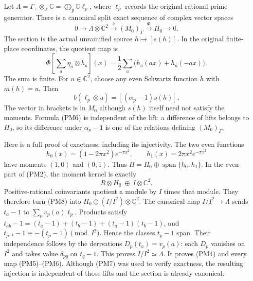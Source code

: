 \documentclass[11pt,a4paper]{article}
\theoremstyle{definition}\newtheorem{definition}[theorem]{Definition}
\begin{document}
Let $\Lambda=\Gamma_+\otimes_{\mathbb Z}\mathbb C
=\bigoplus_p\mathbb C\ell_p$, where $\ell_p$ records the
original rational prime generator. There is a canonical split
exact sequence of complex vector spaces
\[
 0\longrightarrow\Lambda\otimes\mathbb C^2
   \xrightarrow{\ b\ }(M_0)_\Gamma
   \xrightarrow{\ \Phi\ }H_0\longrightarrow0.
 \tag{PM4}
\]
The section is the actual unramified source $h\mapsto[s(h)]$.
In the original finite-place coordinates, the quotient map is
\[
 \Phi\left[\sum_a\eta_a\otimes h_a\right](x)
       =\frac12\sum_a\bigl(h_a(ax)+h_a(-ax)\bigr).
 \tag{PM5}
\]
The sum is finite. For $u\in\mathbb C^2$, choose any even
Schwartz function $h$ with $m(h)=u$. Then
\[
 b(\ell_p\otimes u)=[(\alpha_p-1)s(h)].
 \tag{PM6}
\]
The vector in brackets is in $M_0$ although $s(h)$ itself need
not satisfy the moments. Formula (PM6) is independent of the
lift: a difference of lifts belongs to $H_0$, so its difference
under $\alpha_p-1$ is one of the relations defining $(M_0)_\Gamma$.

Here is a full proof of exactness, including its injectivity.
The two even functions
\[
 h_0(x)=(1-2\pi x^2)e^{-\pi x^2},\qquad
 h_1(x)=2\pi x^2e^{-\pi x^2}
 \tag{PM7}
\]
have moments $(1,0)$ and $(0,1)$. Thus $H=H_0\oplus
\operatorname{span}\{h_0,h_1\}$. In the even part of (PM2),
the moment kernel is exactly
\[
 R\otimes H_0\ \oplus\ I\otimes\mathbb C^2.
 \tag{PM8}
\]
Positive-rational coinvariants quotient a module by $I$ times
that module. They therefore turn (PM8) into
$H_0\oplus(I/I^2)\otimes\mathbb C^2$.
The canonical map $I/I^2\to\Lambda$ sends $t_a-1$ to
$\sum_pv_p(a)\ell_p$. Products satisfy
$t_{ab}-1=(t_a-1)+(t_b-1)+(t_a-1)(t_b-1)$, and
$t_{p^{-1}}-1\equiv-(t_p-1)\pmod{I^2}$. Hence the classes
$t_p-1$ span. Their independence follows by the derivations
$D_p(t_a)=v_p(a)$: each $D_p$ vanishes on $I^2$ and takes
value $\delta_{pq}$ on $t_q-1$. This proves $I/I^2\simeq\Lambda$.
It proves (PM4) and every map (PM5)--(PM6). Although (PM7)
was used to verify exactness, the resulting injection is
independent of those lifts and the section is already canonical.
\end{document}
